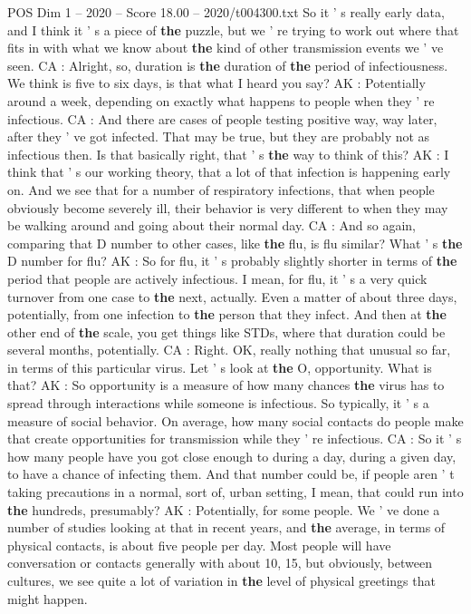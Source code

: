 \begin{textsample}{POS Dim 1 – 2020 – Score 18.00 – 2020/t004300.txt}
So it ' s really early data, and I think it ' s a piece of \textbf{the} puzzle, but we ' re trying to work out where that fits in with what we know about \textbf{the} kind of other transmission events we ' ve seen.
CA : Alright, so, duration is \textbf{the} duration of \textbf{the} period of infectiousness.
We think is five to six days, is that what I heard you say?
AK : Potentially around a week, depending on exactly what happens to people when they ' re infectious.
CA : And there are cases of people testing positive way, way later, after they ' ve got infected.
That may be true, but they are probably not as infectious then.
Is that basically right, that ' s \textbf{the} way to think of this?
AK : I think that ' s our working theory, that a lot of that infection is happening early on.
And we see that for a number of respiratory infections, that when people obviously become severely ill, their behavior is very different to when they may be walking around and going about their normal day.
CA : And so again, comparing that D number to other cases, like \textbf{the} flu, is flu similar?
What ' s \textbf{the} D number for flu?
AK : So for flu, it ' s probably slightly shorter in terms of \textbf{the} period that people are actively infectious.
I mean, for flu, it ' s a very quick turnover from one case to \textbf{the} next, actually.
Even a matter of about three days, potentially, from one infection to \textbf{the} person that they infect.
And then at \textbf{the} other end of \textbf{the} scale, you get things like STDs, where that duration could be several months, potentially.
CA : Right.
OK, really nothing that unusual so far, in terms of this particular virus.
Let ' s look at \textbf{the} O, opportunity.
What is that?
AK : So opportunity is a measure of how many chances \textbf{the} virus has to spread through interactions while someone is infectious.
So typically, it ' s a measure of social behavior.
On average, how many social contacts do people make that create opportunities for transmission while they ' re infectious.
CA : So it ' s how many people have you got close enough to during a day, during a given day, to have a chance of infecting them.
And that number could be, if people aren ' t taking precautions in a normal, sort of, urban setting, I mean, that could run into \textbf{the} hundreds, presumably?
AK : Potentially, for some people.
We ' ve done a number of studies looking at that in recent years, and \textbf{the} average, in terms of physical contacts, is about five people per day.
Most people will have conversation or contacts generally with about 10, 15, but obviously, between cultures, we see quite a lot of variation in \textbf{the} level of physical greetings that might happen.

\end{textsample}
